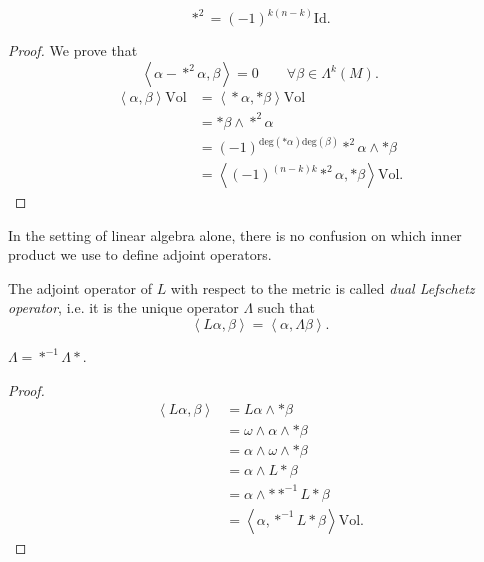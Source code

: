 \begin{lemma}
\label{lemma-hodge-star-squared}
\begin{reference}
\cite[Lemma 5.5]{voi}
\end{reference}
$$
*^2=(-1)^{k(n-k)}\text{Id}.
$$
\end{lemma}

\begin{proof}
We prove that
$$
\left\langle{}\alpha-*^2\alpha,\beta\right\rangle{}=0\qquad
\forall \beta \in \Lambda^k(M).
$$
$$
\begin{aligned}
\left\langle{}\alpha,\beta\right\rangle{}\text{Vol}
&=\left\langle{}*\alpha,*\beta\right\rangle{}\text{Vol}\\
&=*\beta\wedge *^2\alpha\\
&=(-1)^{\text{deg}(*\alpha)
\text{deg}(\beta)}*^2\alpha\wedge *\beta\\
&=\left\langle{}(-1)^{(n-k)k}*^2\alpha,
*\beta\right\rangle{}\text{Vol}.
\end{aligned}
$$
\end{proof}

\noindent
In the setting of linear algebra alone,
there is no confusion on which inner product
we use to define adjoint operators.

\begin{definition}
\label{definition-dual-lefschetz}
The adjoint operator of $L$ with respect to
the metric
is called {\it dual Lefschetz operator}, i.e.
it is
the unique operator $\Lambda$ such that
$$
\left\langle{}L \alpha,\beta\right\rangle{}=\left\langle{}\alpha,
\Lambda \beta\right\rangle{}.
$$
\end{definition}

\begin{exercise}
\label{exercise-dual-lefsc-hodge-twist}
$\Lambda=*^{-1}\Lambda *$.
\end{exercise}

\begin{proof}
$$
\begin{aligned}
\left\langle{}L \alpha,\beta\right\rangle{}
&=L \alpha\wedge*\beta\\
&=\omega\wedge\alpha\wedge*\beta\\
&=\alpha\wedge\omega\wedge*\beta\\
&=\alpha\wedge L * \beta\\
&=\alpha\wedge * *^{-1}L * \beta\\
&=\left\langle{}\alpha,*^{-1}L *
\beta\right\rangle{}\text{Vol}.
\end{aligned}
$$
\end{proof}

